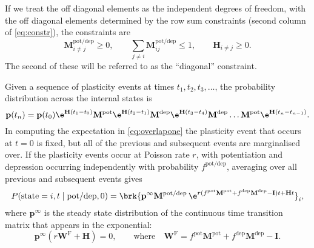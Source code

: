 \documentclass[12pt]{article}
\newcommand{\I}{\mathbf{I}}
\newcommand{\pr}{\mathbf{p}}
\newcommand{\eq}{\pr^\infty}
\newcommand{\W}{\mathbf{W}}
\newcommand{\M}{\mathbf{M}}
\newcommand{\frg}{\W^{\mathrm{F}}}
\newcommand{\pot}{^{\text{pot}}}
\newcommand{\dep}{^{\text{dep}}}
\newcommand{\potdep}{^{\text{pot/dep}}}
\renewcommand{\hom}{\mathbf{H}}
\begin{document}
If we treat the off diagonal elements as the independent degrees of freedom, with the off diagonal elements determined by the row sum constraints (second column of \eqref{eq:constr}), the constraints are
%
\begin{equation}\label{eq:constri}
  \M\potdep_{i \neq j} \geq 0, \qquad
  \sum_{j\neq i} \M\potdep_{ij} \leq 1, \qquad
  \hom_{i \neq j} \geq 0.
\end{equation}
%
The second of these will be referred to as the ``diagonal'' constraint.

Given a sequence of plasticity events at times $t_1,t_2,t_3,\ldots$, the probability distribution across the internal states is
%
\begin{equation}\label{eq:plastseq}
  \pr(t_n) = \pr(t_0) \e^{\hom(t_1-t_0)} \M\pot \e^{\hom(t_2-t_1)} \M\dep \e^{\hom(t_3-t_4)} \M\dep \ldots \M\pot \e^{\hom(t_n-t_{n-1})}.
\end{equation}
%
In computing the expectation in \eqref{eq:overlapone} the plasticity event that occurs at $t=0$ is fixed, but all of the previous and subsequent events are marginalised over.
If the plasticity events occur at Poisson rate $r$, with potentiation and depression occurring independently with probability $f\potdep$, averaging over all previous and subsequent events gives
%
\begin{equation}\label{eq:plastseqav}
  P(\text{state}=i,t \mid \text{pot/dep},0) = \brk{ \eq \M\potdep\, \e^{r(f\pot\M\pot+f\dep\M\dep-\I)t +\hom t} }_i,
\end{equation}
%
where $\eq$ is the steady state distribution of the continuous time transition matrix that appears in the exponential:
%
\begin{equation}\label{eq:eq}
  \eq(r\frg +\hom) = 0,
  \qquad\text{where}\quad
  \frg = f\pot\M\pot + f\dep\M\dep - \I.
\end{equation}
%
\end{document}
